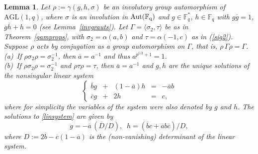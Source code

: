 \documentclass[12pt]{article}
\newtheorem{lemma}[theorem]{Lemma}
\theoremstyle{definition}\newtheorem{definition}{Definition}[section]
\begin{document}
\begin{lemma}
\label{conjlemma}
Let $\rho:=\gamma(g,h,\sigma)$ be an involutory group automorphism of $\mathrm{AGL}(1,q)$, where $\sigma$ is an involution in $\rm{Aut}(\mathbb{F}_q)$ and $g\in\mathbb{F}_q^*$, $h\in\mathbb{F}_q$ with $g\overline{g}= 1$, $g\overline{h}+h=0$ (see Lemma~\ref{invgrauts}). Let $\Gamma=\langle\sigma_2,\tau\rangle$ be as in Theorem~\ref{gamprops}, with $\sigma_{2}=\alpha(a,b)$ and $\tau=\alpha(-1,c)$ as in (\ref{sig2}). Suppose $\rho$ acts by conjugation as a group automorphism on $\Gamma$, that is, $\rho\,\Gamma\rho=\Gamma$. \\[.03in]
(a)\ If $\rho \sigma_2\rho = \sigma_2^{-1}$, then $\overline{a}=a^{-1}$ and thus $a^{p^{l/2} +1}=1$.\\[.03in]
(b)\ If $\rho \sigma_2\rho = \sigma_2^{-1}$ and $\rho\tau\rho=\tau$, then $\overline{a}=a^{-1}$ and $g,h$ are the unique solutions of the nonsingular linear system
\begin{equation}
\label{linsystem}
\left\{\begin{array}{rcrcr}
\overline{b} g &+& (1-\overline{a})h &=& -\overline{a}b \\
\overline{c} g &+& 2h &= &c,
\end{array}\right.
\end{equation}
where for simplicity the variables of the system were also denoted by $g$ and $h$. The solutions to \eqref{linsystem} are given by 
\begin{equation}
\label{systemsols}
g=-\overline{a}\,(\overline{D}/{D}),
\;\;h=(\overline{b}c+\overline{a}b\overline{c})/D,
\end{equation}
where $D:=2\overline{b}-\overline{c}(1-\overline{a})$ is the (non-vanishing) determinant of the linear system.
\end{lemma}
\end{document}
